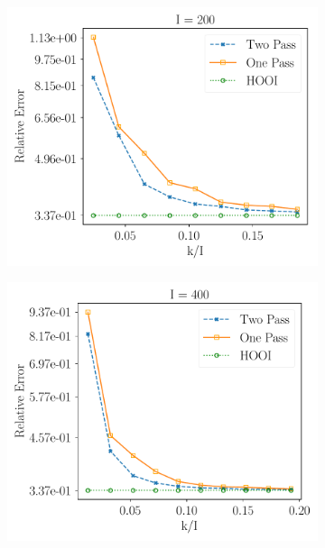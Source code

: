 \begin{figure}[H]
\begin{subfigure}{0.32\textwidth}
    \includegraphics[scale = 0.3]{figure/spd_n200.pdf}
    \end{subfigure}
    \begin{subfigure}{0.32\textwidth}
    \includegraphics[scale = 0.3]{figure/spd_n400.pdf}
    \end{subfigure}
    \begin{subfigure}{0.32\textwidth}

\end{subfigure}
\end{figure}
